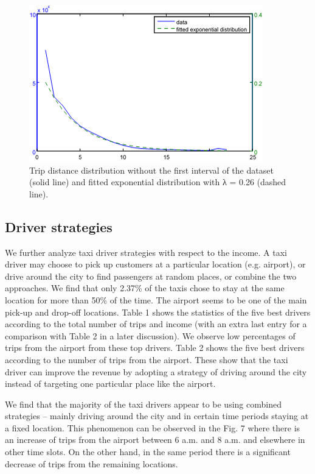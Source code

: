 \documentclass[a4paper, 10pt, conference]{ieeeconf}      %
\begin{document}
\begin{figure}[htbp]
    \centering
    \includegraphics{fig/png6.png}
    \caption{Trip distance distribution without the first interval of the dataset (solid line) and fitted exponential distribution with λ = 0.26 (dashed line).}
    \label{fig:my_png_6}
\end{figure}

\subsection{Driver strategies}We further analyze taxi driver strategies with respect to the income. A taxi driver may choose to pick up customers at a particular location (e.g. airport), or drive around the city to find passengers at random places, or combine the two approaches. We find that only 2.37\% of the taxis chose to stay at the same location for more than 50\% of the time. The airport seems to be one of the main pick-up and drop-off locations. Table 1 shows the statistics of the five best drivers according to the total number of trips and income (with an extra last entry for a comparison with Table 2 in a later discussion). We observe low percentages of trips from the airport from these top drivers. Table 2 shows the five best drivers according to the number of trips from the airport. These show that the taxi driver can improve the revenue by adopting a strategy of driving around the city instead of targeting one particular place like the airport. 


We find that the majority of the taxi drivers appear to be using combined strategies – mainly driving around the city and in certain time periods staying at a fixed location. This phenomenon can be observed in the Fig. 7 where there is an increase of trips from the airport between 6 a.m. and 8 a.m. and elsewhere in other time slots. On the other hand, in the same period there is a significant decrease of trips from the remaining locations.  
\end{document}
